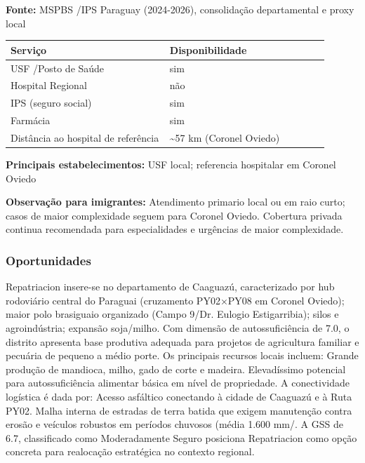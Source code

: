 \textbf{Fonte:} MSPBS /\allowbreak  IPS Paraguay (2024-2026), consolidação
departamental e proxy local

{\def\LTcaptype{none} %
\begin{longtable}{@{}>{\raggedright\arraybackslash}p{0.45\linewidth} >{\raggedright\arraybackslash}p{0.45\linewidth}@{}}
\toprule\noalign{}
Serviço & Disponibilidade \\
\midrule\noalign{}
\endhead
\bottomrule\noalign{}
\endlastfoot
USF /\allowbreak  Posto de Saúde & sim \\
Hospital Regional & não \\
IPS (seguro social) & sim \\
Farmácia & sim \\
Distância ao hospital de referência & \textasciitilde57 km (Coronel
Oviedo) \\
\end{longtable}
}

\textbf{Principais estabelecimentos:} USF local; referencia hospitalar
em Coronel Oviedo

\textbf{Observação para imigrantes:} Atendimento primario local ou em
raio curto; casos de maior complexidade seguem para Coronel Oviedo.
Cobertura privada continua recomendada para especialidades e urgências
de maior complexidade.
\newpage

\subsubsection*{Oportunidades}\label{oport-repatriacion-0507}
Repatriacion insere-se no departamento de Caaguazú, caracterizado por hub rodoviário central do Paraguai (cruzamento PY02×PY08 em Coronel Oviedo); maior polo brasiguaio organizado (Campo 9/Dr. Eulogio Estigarribia); silos e agroindústria; expansão soja/milho. Com dimensão de autossuficiência de 7.0, o distrito apresenta base produtiva adequada para projetos de agricultura familiar e pecuária de pequeno a médio porte. Os principais recursos locais incluem: Grande produção de mandioca, milho, gado de corte e madeira. Elevadíssimo potencial para autossuficiência alimentar básica em nível de propriedade. A conectividade logística é dada por: Acesso asfáltico conectando à cidade de Caaguazú e à Ruta PY02. Malha interna de estradas de terra batida que exigem manutenção contra erosão e veículos robustos em períodos chuvosos (média 1.600 mm/. A GSS de 6.7, classificado como Moderadamente Seguro posiciona Repatriacion como opção concreta para realocação estratégica no contexto regional.

